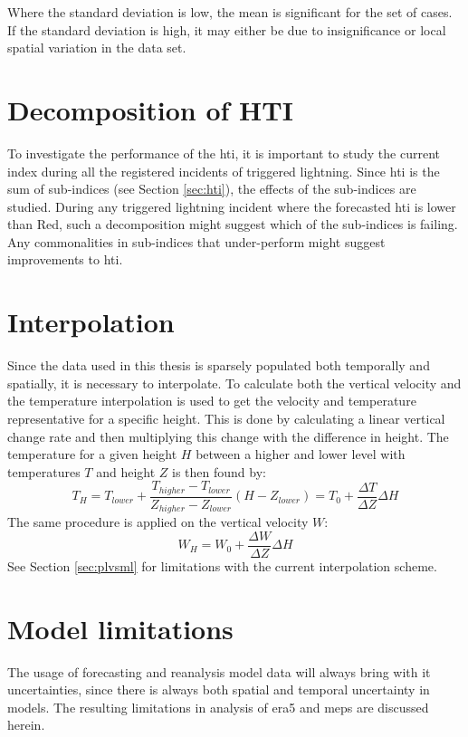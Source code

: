 Where the standard deviation is low, the mean is significant for the set of cases. If the standard deviation is high, it may either be due to insignificance or local spatial variation in the data set.

\section{Decomposition of HTI}\label{sec:decomposition}
To investigate the performance of the \acrlong{hti}, it is important to study the current index during all the registered incidents of triggered lightning. Since \acrshort{hti} is the sum of sub-indices (see Section \ref{sec:hti}), the effects of the sub-indices are studied. During any triggered lightning incident where the forecasted \acrshort{hti} is lower than Red, such a decomposition might suggest which of the sub-indices is failing. Any commonalities in sub-indices that under-perform might suggest improvements to \acrshort{hti}.

\section{Interpolation}\label{sec:interpolation}
Since the data used in this thesis is sparsely populated both temporally and spatially, it is necessary to interpolate. To calculate both the vertical velocity and the temperature interpolation is used to get the velocity and temperature representative for a specific height. This is done by calculating a linear vertical change rate and then multiplying this change with the difference in height. 
The temperature for a given height $H$ between a higher and lower level with temperatures $T$ and height $Z$ is then found by: 
\[ T_H = T_{lower} + \frac{T_{higher} - T_{lower}}{Z_{higher} - Z_{lower}} (H - Z_{lower}) = T_0 + \frac{\Delta T}{\Delta Z}\Delta H\]
The same procedure is applied on the vertical velocity $W$:
\[W_H = W_0 + \frac{\Delta W}{\Delta Z}\Delta H\]
See Section \ref{sec:plvsml} for limitations with the current interpolation scheme.

\section{Model limitations}\label{sec:limitations}
The usage of forecasting and reanalysis model data will always bring with it uncertainties, since there is always both spatial and temporal uncertainty in models. The resulting limitations in analysis of \acrshort{era5} and \acrshort{meps} are discussed herein.

